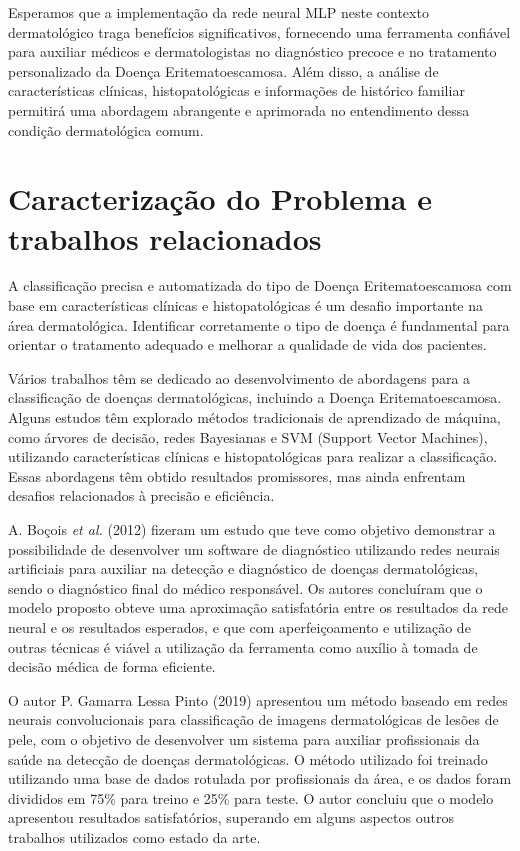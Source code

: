 \documentclass[conference]{IEEEtran}
\begin{document}
Esperamos que a implementação da rede neural MLP neste contexto dermatológico traga benefícios significativos, fornecendo uma ferramenta confiável para auxiliar médicos e dermatologistas no diagnóstico precoce e no tratamento personalizado da Doença Eritematoescamosa. Além disso, a análise de características clínicas, histopatológicas e informações de histórico familiar permitirá uma abordagem abrangente e aprimorada no entendimento dessa condição dermatológica comum.

\section{Caracterização do Problema e trabalhos relacionados}
A classificação precisa e automatizada do tipo de Doença Eritematoescamosa com base em características clínicas e histopatológicas é um desafio importante na área dermatológica. Identificar corretamente o tipo de doença é fundamental para orientar o tratamento adequado e melhorar a qualidade de vida dos pacientes. 

Vários trabalhos têm se dedicado ao desenvolvimento de abordagens para a classificação de doenças dermatológicas, incluindo a Doença Eritematoescamosa. Alguns estudos têm explorado métodos tradicionais de aprendizado de máquina, como árvores de decisão, redes Bayesianas e SVM (Support Vector Machines), utilizando características clínicas e histopatológicas para realizar a classificação. Essas abordagens têm obtido resultados promissores, mas ainda enfrentam desafios relacionados à precisão e eficiência.

A. Boçois \textit{et al.} (2012) fizeram um estudo que teve como objetivo demonstrar a possibilidade de desenvolver um software de diagnóstico utilizando redes neurais artificiais para auxiliar na detecção e diagnóstico de doenças dermatológicas, sendo o diagnóstico final do médico responsável. Os autores concluíram que o modelo proposto obteve uma aproximação satisfatória entre os resultados da rede neural e os resultados esperados, e que com aperfeiçoamento e utilização de outras técnicas é viável a utilização da ferramenta como auxílio à tomada de decisão médica de forma eficiente.

O autor P. Gamarra Lessa Pinto (2019) apresentou um método baseado em redes neurais convolucionais para classificação de imagens dermatológicas de lesões de pele, com o objetivo de desenvolver um sistema para auxiliar profissionais da saúde na detecção de doenças dermatológicas. O método utilizado foi treinado utilizando uma base de dados rotulada por profissionais da área, e os dados foram divididos em 75\% para treino e 25\% para teste. O autor concluiu que o modelo apresentou resultados satisfatórios, superando em alguns aspectos outros trabalhos utilizados como estado da arte.
\end{document}
